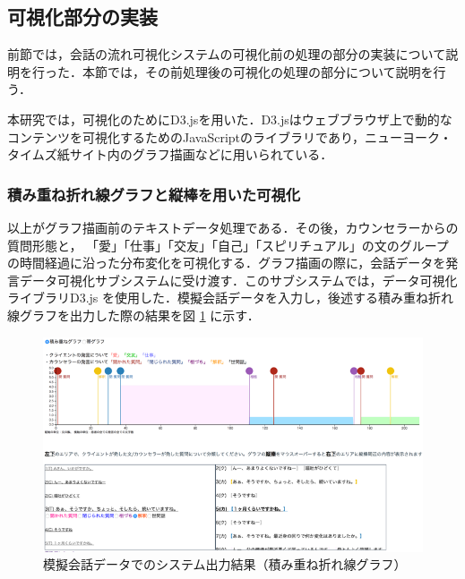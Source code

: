 \documentclass[shuuron]{kuee}
\begin{document}

\subsection{可視化部分の実装} %

前節では，会話の流れ可視化システムの可視化前の処理の部分の実装について説明を行った．本節では，その前処理後の可視化の処理の部分について説明を行う．





本研究では，可視化のためにD3.js\cite{vand3}を用いた．D3.jsはウェブブラウザ上で動的なコンテンツを可視化するためのJavaScriptのライブラリであり，ニューヨーク・タイムズ紙サイト内のグラフ描画などに用いられている．




\subsubsection{積み重ね折れ線グラフと縦棒を用いた可視化}
以上がグラフ描画前のテキストデータ処理である．その後，カウンセラーからの質問形態と， 「愛」「仕事」「交友」「自己」「スピリチュアル」の文のグループの時間経過に沿った分布変化を可視化する．グラフ描画の際に，会話データを発言データ可視化サブシステムに受け渡す．このサブシステムでは，データ可視化ライブラリD3.js
\cite{bostock2012d3}
を使用した．模擬会話データを入力し，後述する積み重ね折れ線グラフを出力した際の結果を図
\ref{fig:6_1}
に示す．
\begin{figure}
  \begin{center}
    \includegraphics[width=\linewidth]{6_1.png}
  \end{center}
  \caption{模擬会話データでのシステム出力結果（積み重ね折れ線グラフ）}
  \label{fig:6_1}
\end{figure}
\end{document}
